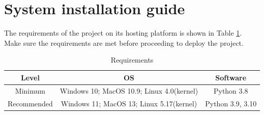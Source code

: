 \section{System installation guide}
\label{sec:deployment}

The requirements of the project on its hosting platform is shown in Table \ref{tab:req}. Make sure the requirements are met before proceeding to deploy the project.

\setlength{\tabcolsep}{12pt}
\renewcommand{\arraystretch}{1.2}
\begin{table}[h!]
    \centering
    \begin{tabular}{c|c|c}
        Level & OS & Software \\
        \hline\hline
        Minimum& Windows 10; MacOS 10.9; Linux 4.0(kernel) & Python 3.8 \\
        Recommended & Windows 11; MacOS 13; Linux 5.17(kernel) & Python 3.9, 3.10\\
    \end{tabular}
    \caption{Requirements}
    \label{tab:req}
\end{table}
\renewcommand{\arraystretch}{1}
\setlength{\tabcolsep}{0pt}


